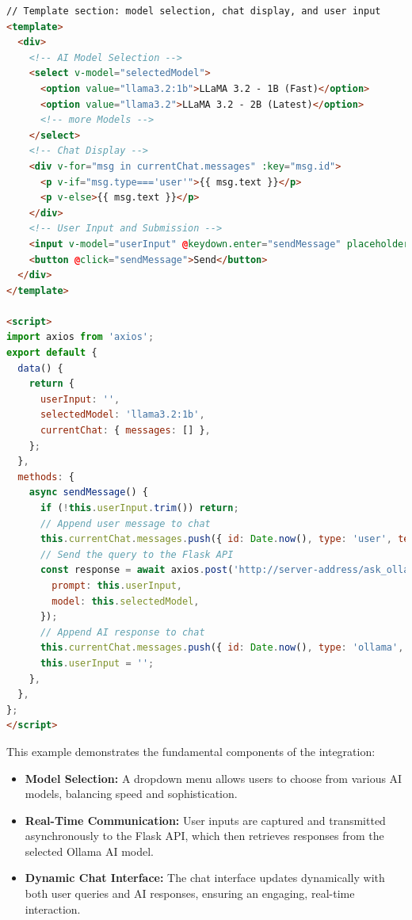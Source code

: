 \begin{lstlisting}[language=html, caption={Abbreviated Vue.js Integration Example}, frame=single]
// Template section: model selection, chat display, and user input
<template>
  <div>
    <!-- AI Model Selection -->
    <select v-model="selectedModel">
      <option value="llama3.2:1b">LLaMA 3.2 - 1B (Fast)</option>
      <option value="llama3.2">LLaMA 3.2 - 2B (Latest)</option>
      <!-- more Models -->
    </select>
    <!-- Chat Display -->
    <div v-for="msg in currentChat.messages" :key="msg.id">
      <p v-if="msg.type==='user'">{{ msg.text }}</p>
      <p v-else>{{ msg.text }}</p>
    </div>
    <!-- User Input and Submission -->
    <input v-model="userInput" @keydown.enter="sendMessage" placeholder="Ask the AI question..." />
    <button @click="sendMessage">Send</button>
  </div>
</template>

<script>
import axios from 'axios';
export default {
  data() {
    return {
      userInput: '',
      selectedModel: 'llama3.2:1b',
      currentChat: { messages: [] },
    };
  },
  methods: {
    async sendMessage() {
      if (!this.userInput.trim()) return;
      // Append user message to chat
      this.currentChat.messages.push({ id: Date.now(), type: 'user', text: this.userInput });
      // Send the query to the Flask API
      const response = await axios.post('http://server-address/ask_ollama', {
        prompt: this.userInput,
        model: this.selectedModel,
      });
      // Append AI response to chat
      this.currentChat.messages.push({ id: Date.now(), type: 'ollama', text: response.data.choices[0].text });
      this.userInput = '';
    },
  },
};
</script>
\end{lstlisting}

This example demonstrates the fundamental components of the integration:
\begin{itemize}
  \item \textbf{Model Selection:} A dropdown menu allows users to choose from various AI models, balancing speed and sophistication.
  \item \textbf{Real-Time Communication:} User inputs are captured and transmitted asynchronously to the Flask API, which then retrieves responses from the selected Ollama AI model.
  \item \textbf{Dynamic Chat Interface:} The chat interface updates dynamically with both user queries and AI responses, ensuring an engaging, real-time interaction.
\end{itemize}


